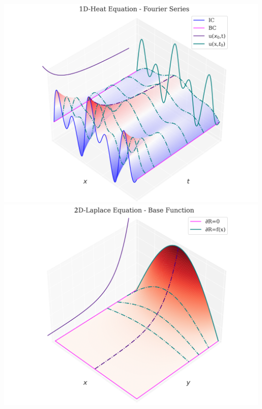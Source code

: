 \includegraphics[width=0.85\linewidth]{../images/1d_heat_fs.png}\\
\includegraphics[width=0.85\linewidth]{../images/2d_laplace.png}
